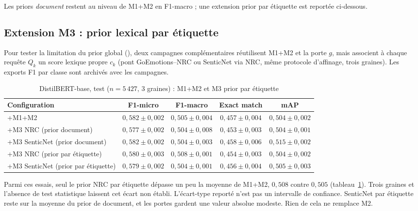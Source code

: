 Les priors \emph{document} restent au niveau de M1+M2 en F1-macro ; une
extension prior par étiquette est reportée ci-dessous.

\subsection{Extension M3 : prior lexical par étiquette}
\label{sec:expe-m3-per-label}

Pour tester la limitation du prior global (),
deux campagnes complémentaires réutilisent M1+M2 et la porte $g$, mais
associent à chaque requête $Q_k$ un score lexique propre $c_k$ (pont
GoEmotions–NRC ou SenticNet via NRC, même protocole d'affinage,
trois graines). Les exports F1 par classe sont archivés avec les
campagnes.

\begin{table}[H]
\centering
\caption{DistilBERT-base, test ($n{=}5\,427$, 3 graines) : M1+M2 et M3 prior par étiquette}
\label{tab:expe-m3-per-label-distilbert}
\renewcommand{\arraystretch}{1.2}
\setlength{\tabcolsep}{3.5pt}
\small
\begin{tabular}{|l|c|c|c|c|}
\hline
\textbf{Configuration} & \textbf{F1-micro} & \textbf{F1-macro} & \textbf{Exact match} & \textbf{mAP} \\
\hline
+M1+M2 & $0{,}582 \pm 0{,}002$ & $0{,}505 \pm 0{,}004$ & $0{,}457 \pm 0{,}004$ & $0{,}504 \pm 0{,}002$ \\
\hline
+M3 NRC (prior document) & $0{,}577 \pm 0{,}002$ & $0{,}504 \pm 0{,}008$ & $0{,}453 \pm 0{,}003$ & $0{,}504 \pm 0{,}001$ \\
\hline
+M3 SenticNet (prior document) & $0{,}582 \pm 0{,}002$ & $0{,}504 \pm 0{,}003$ & $0{,}458 \pm 0{,}006$ & $0{,}515 \pm 0{,}002$ \\
\hline
+M3 NRC (prior par étiquette) & $0{,}580 \pm 0{,}003$ & $0{,}508 \pm 0{,}001$ & $0{,}454 \pm 0{,}003$ & $0{,}504 \pm 0{,}002$ \\
\hline
+M3 SenticNet (prior par étiquette) & $0{,}579 \pm 0{,}002$ & $0{,}504 \pm 0{,}001$ & $0{,}456 \pm 0{,}004$ & $0{,}505 \pm 0{,}003$ \\
\hline
\end{tabular}
\end{table}

Parmi ces essais, seul le prior NRC par étiquette dépasse un peu la
moyenne de M1+M2, $0{,}508$ contre $0{,}505$
(tableau~\ref{tab:expe-m3-per-label-distilbert}). Trois graines et
l'absence de test statistique laissent cet écart non établi. L'écart-type
reporté n'est pas un intervalle de confiance. SenticNet par étiquette
reste sur la moyenne du prior de document, et les portes gardent une
valeur absolue modeste. Rien de cela ne remplace M2.

